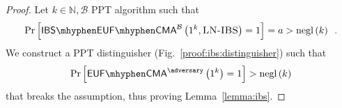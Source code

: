     \begin{proof}
      Let $k \in \mathbb{N}, \mathcal{B}$ PPT algorithm such that
      \begin{equation*}
        \Pr\left[\mathsf{IBS \mhyphen EUF \mhyphen
        CMA}^{\mathcal{B}}\left(1^k, \textsc{LN-IBS}\right) = 1\right] = a >
        \mathrm{negl}\left(k\right) \enspace.
      \end{equation*}
      We construct a PPT distinguisher \adversary{}
      (Fig.~\ref{proof:ibs:distinguisher}) such that
      \begin{equation*}
        \Pr\left[\mathsf{EUF \mhyphen CMA}^{\adversary}\left(1^k\right) =
        1\right] > \mathrm{negl}\left(k\right)
      \end{equation*}
      that breaks the assumption, thus proving Lemma~\ref{lemma:ibs}.


\end{proof}
